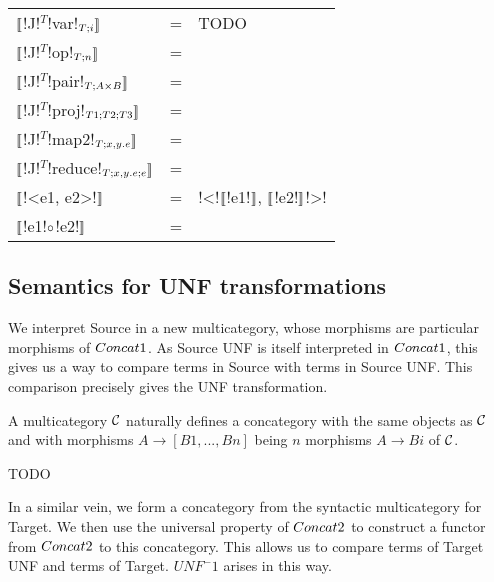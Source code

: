 
\begin{tabular}{l c l}
    $\llbracket$!J!$^T$!var!$_{T;i} \rrbracket$ &=& TODO \\
    $\llbracket$!J!$^T$!op!$_{T;n} \rrbracket$ &=&  \\
    $\llbracket$!J!$^T$!pair!$_{T;A\times B} \rrbracket$ &=& \\
    $\llbracket$!J!$^T$!proj!$_{T1;T2;T3} \rrbracket$ &=& \\
    $\llbracket$!J!$^T$!map2!$_{T;x,y.e}\rrbracket$  &=& \\
    $\llbracket$!J!$^T$!reduce!$_{T;x,y.e;e}\rrbracket$  &=& \\
    $\llbracket$!<e1, e2>!$\rrbracket$  &=& !<!$\llbracket$!e1!$\rrbracket$, $\llbracket$!e2!$\rrbracket$!>! \\
    $\llbracket$!e1!$\circ$!e2!$\rrbracket$ &=&  \\
 \end{tabular}

\subsection{Semantics for UNF transformations} %
\label{sub:Semantics for UNF transformations}

We interpret Source in a new multicategory, 
whose morphisms are particular morphisms of $Concat1$.
As Source UNF is itself interpreted in $Concat1$, 
this gives us a way to compare terms in Source with terms in Source UNF.
This comparison precisely gives the UNF transformation.

\begin{definition}
    A multicategory $\mathcal{C}$ naturally defines a concategory with the same objects as $\mathcal{C}$ and
    with morphisms $A\to [B1,...,Bn]$ being $n$ morphisms $A\to Bi$ of $\mathcal{C}$. 
\end{definition}

\begin{proposition}
    TODO
\end{proposition}

In a similar vein, we form a concategory from the syntactic multicategory for Target.
We then use the universal property of $Concat2$ to construct a functor from $Concat2$ to this concategory.
This allows us to compare terms of Target UNF and terms of Target. 
$UNF^-1$ arises in this way.

